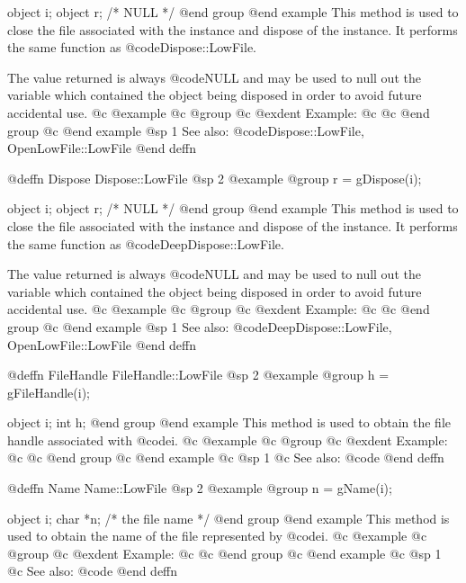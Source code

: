 object  i;
object  r;     /*  NULL  */
@end group
@end example
This method is used to close the file associated with the instance and
dispose of the instance.  It performs the same function as
@code{Dispose::LowFile}.  

The value returned is always @code{NULL} and may be used to null out
the variable which contained the object being disposed in order to
avoid future accidental use.
@c @example
@c @group
@c @exdent Example:
@c 
@c @end group
@c @end example
@sp 1
See also:  @code{Dispose::LowFile, OpenLowFile::LowFile}
@end deffn











@deffn {Dispose} Dispose::LowFile
@sp 2
@example
@group
r = gDispose(i);

object  i;
object  r;     /*  NULL  */
@end group
@end example
This method is used to close the file associated with the instance and
dispose of the instance.  It performs the same function as
@code{DeepDispose::LowFile}.  

The value returned is always @code{NULL} and may be used to null out
the variable which contained the object being disposed in order to
avoid future accidental use.
@c @example
@c @group
@c @exdent Example:
@c 
@c @end group
@c @end example
@sp 1
See also:  @code{DeepDispose::LowFile, OpenLowFile::LowFile}
@end deffn












@deffn {FileHandle} FileHandle::LowFile
@sp 2
@example
@group
h = gFileHandle(i);

object  i;
int     h;
@end group
@end example
This method is used to obtain the file handle associated with @code{i}.
@c @example
@c @group
@c @exdent Example:
@c 
@c @end group
@c @end example
@c @sp 1
@c See also:  @code{}
@end deffn









@deffn {Name} Name::LowFile
@sp 2
@example
@group
n = gName(i);

object  i;
char    *n;  /*  the file name  */
@end group
@end example
This method is used to obtain the name of the file represented by @code{i}.
@c @example
@c @group
@c @exdent Example:
@c 
@c @end group
@c @end example
@c @sp 1
@c See also:  @code{}
@end deffn



